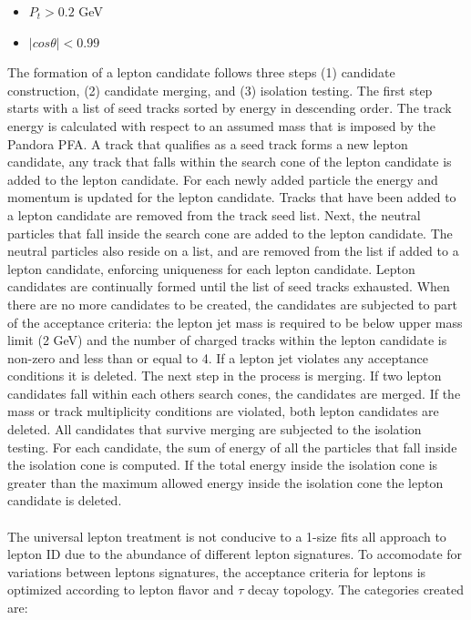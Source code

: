 \begin{itemize}
\item $P_t > 0.2$ GeV
\item $|cos\theta| < 0.99$
\end{itemize}
The formation of a lepton candidate follows three steps (1) candidate construction, (2) candidate merging, and (3) isolation testing.
The first step starts with a list of seed tracks sorted by energy in descending order. The track energy is calculated with respect to an assumed mass that is imposed by the Pandora PFA.  A track that qualifies as a seed track forms a new lepton candidate, any track that falls within the search cone of the lepton candidate is added to the lepton candidate. For each newly added particle the energy and momentum is updated for the lepton candidate. Tracks that have been added to a lepton candidate are removed from the track seed list. Next, the neutral particles that fall inside the search cone are added to the lepton candidate. The neutral particles also reside on a list, and are removed from the list if added to a lepton candidate, enforcing uniqueness for each lepton candidate. Lepton candidates are continually formed until the list of seed tracks exhausted. When there are no more candidates to be created, the candidates are subjected to part of the acceptance criteria: the lepton jet mass is required to be below upper mass limit (2 GeV) and the number of charged tracks within the lepton candidate is non-zero and less than or equal to 4. If a lepton jet violates any acceptance conditions it is deleted. The next step in the process is merging. If two lepton candidates fall within each others search cones, the candidates are merged. If the mass or track multiplicity conditions are violated, both lepton candidates are deleted.  All  candidates that survive merging are subjected to the isolation testing. For each candidate, the sum of energy of all the particles that fall inside the isolation cone is computed. If the total energy inside the isolation cone is greater than the maximum allowed energy inside the isolation cone the lepton candidate is deleted.\\
\quad \quad \\
The universal lepton treatment is not conducive to a 1-size fits all approach to lepton ID due to the abundance of different lepton signatures. To accomodate for variations between leptons signatures, the acceptance criteria for leptons is optimized according to lepton flavor and $\tau$ decay topology. The categories created are:\\

